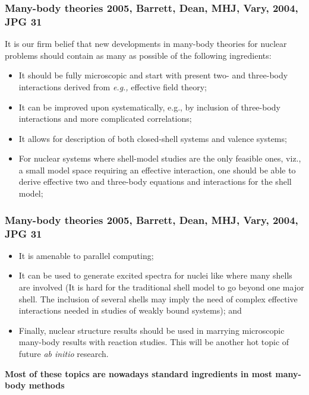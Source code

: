 \documentclass[compress]{beamer}
\begin{document}
\frame
{
  \frametitle{Many-body theories 2005, Barrett, Dean, MHJ, Vary, 2004, JPG {\bf 31}}
It is our firm belief 
that new developments in many-body theories
for nuclear problems should contain as many as possible of the 
following ingredients:
\begin{itemize}
\item
It should be fully microscopic and start with present two- and three-body
interactions derived from {\it e.g.,} effective field theory;
\item It can be improved upon systematically, e.g., by inclusion of
three-body interactions and more complicated correlations;
\item It allows for description of both closed-shell 
systems and valence systems;
\item For nuclear systems where shell-model studies are the only feasible ones,
viz., a small model space requiring an effective interaction, 
one should be able to
derive  effective two and three-body 
equations and interactions for the shell
model;
\end{itemize}

}



\frame
{
  \frametitle{Many-body theories 2005, Barrett, Dean, MHJ, Vary, 2004, JPG {\bf 31}}
\begin{itemize}
\item It is amenable to parallel computing;
\item It can be used to generate excited spectra for nuclei like 
where many shells are involved (It is hard for the traditional shell model
to go beyond one major shell.  The inclusion of several shells may imply 
the need of  complex effective interactions
needed in studies of weakly bound systems); and
\item Finally, nuclear structure results should be used in marrying microscopic 
many-body results with reaction studies. This will be another hot topic
of future {\it ab initio} research.
\end{itemize}

{\bf Most of these topics are nowadays standard ingredients in most many-body methods}

}
\end{document}
